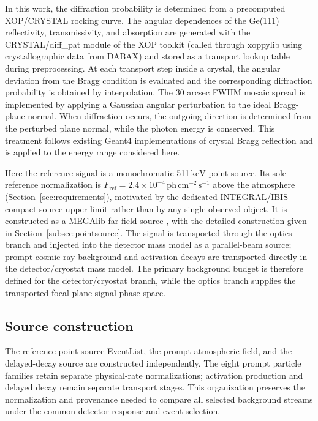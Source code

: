 \documentclass[11pt]{article}
\newcommand{\revblue}[1]{\textcolor{revisionblue}{#1}}
\newcommand{\keV}{\ensuremath{\,\mathrm{keV}}}
\newcommand{\phcms}{\ensuremath{\,\mathrm{ph\,cm^{-2}\,s^{-1}}}}
\newcommand{\fref}{F_{\mathrm{ref}}}
\begin{document}
In this work, the diffraction probability is determined from a precomputed XOP/CRYSTAL rocking curve. The angular dependences of the Ge(111) reflectivity, transmissivity, and absorption are generated with the CRYSTAL/diff\_pat module of the XOP toolkit (called through xoppylib using crystallographic data from DABAX) \cite{SanchezDelRio2011XOP} and stored as a transport lookup table during preprocessing. At each transport step inside a crystal, the angular deviation from the Bragg condition is evaluated and the corresponding diffraction probability is obtained by interpolation. The 30 arcsec FWHM mosaic spread is implemented by applying a Gaussian angular perturbation to the ideal Bragg-plane normal. When diffraction occurs, the outgoing direction is determined from the perturbed plane normal, while the photon energy is conserved. This treatment follows existing Geant4 implementations of crystal Bragg reflection \cite{Guan2023BraggReflection,Reiazi2025G4BraggReflection} and is applied to the energy range considered here.

Here the reference signal is a monochromatic 511\keV{} point source. Its sole
reference normalization is $\fref=2.4\times10^{-4}\phcms$ above the atmosphere
(Section~\ref{sec:requirements}), motivated by the dedicated INTEGRAL/IBIS
compact-source upper limit \cite{DeCesare2011} rather than by any single
observed object. It is constructed as a MEGAlib far-field source
\cite{Zoglauer2006}, with the detailed construction given in
Section~\ref{subsec:pointsource}. The signal is transported through the optics
branch and injected into the detector mass model as a parallel-beam source;
prompt cosmic-ray background and activation decays are transported directly in
the detector/cryostat mass model. The primary background budget is therefore
defined for the detector/cryostat branch, while the optics branch supplies the
transported focal-plane signal phase space.

\subsection{Source construction}
\label{sec:background}

The reference point-source EventList, the prompt atmospheric field, and the
delayed-decay source are constructed independently. \revblue{The eight prompt
particle families retain separate physical-rate normalizations}; activation production and delayed
decay remain separate transport stages. This organization preserves the
normalization and provenance needed to compare all selected background streams
under the common detector response and event selection.
\end{document}
